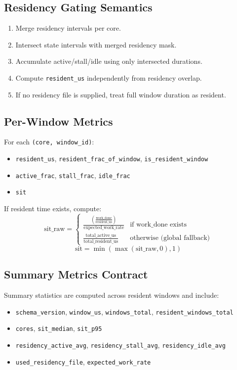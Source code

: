 \documentclass[11pt,a4paper]{article}
\begin{document}
\subsection{Residency Gating Semantics}
\begin{enumerate}[leftmargin=1.4em]
  \item Merge residency intervals per core.
  \item Intersect state intervals with merged residency mask.
  \item Accumulate active/stall/idle using only intersected durations.
  \item Compute \texttt{resident\_us} independently from residency overlap.
  \item If no residency file is supplied, treat full window duration as resident.
\end{enumerate}

\subsection{Per-Window Metrics}
For each \texttt{(core, window\_id)}:
\begin{itemize}[leftmargin=1.4em]
  \item \texttt{resident\_us}, \texttt{resident\_frac\_of\_window}, \texttt{is\_resident\_window}
  \item \texttt{active\_frac}, \texttt{stall\_frac}, \texttt{idle\_frac}
  \item \texttt{sit}
\end{itemize}

If resident time exists, compute:
\[
\text{sit\_raw} =
\begin{cases}
\frac{\left(\frac{\text{work\_done}}{\text{resident\_us}}\right)}{\text{expected\_work\_rate}} & \text{if work\_done exists} \\
\frac{\text{total\_active\_us}}{\text{total\_resident\_us}} & \text{otherwise (global fallback)}
\end{cases}
\]
\[
\text{sit} = \min(\max(\text{sit\_raw}, 0), 1)
\]

\subsection{Summary Metrics Contract}
Summary statistics are computed across resident windows and include:
\begin{itemize}[leftmargin=1.4em]
  \item \texttt{schema\_version}, \texttt{window\_us}, \texttt{windows\_total}, \texttt{resident\_windows\_total}
  \item \texttt{cores}, \texttt{sit\_median}, \texttt{sit\_p95}
  \item \texttt{residency\_active\_avg}, \texttt{residency\_stall\_avg}, \texttt{residency\_idle\_avg}
  \item \texttt{used\_residency\_file}, \texttt{expected\_work\_rate}
\end{itemize}
\end{document}
